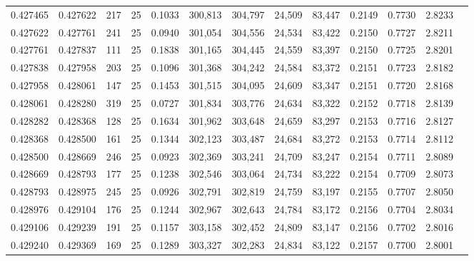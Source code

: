 \begin{tabular}{rrrrrrrrrrrrr}
0.427465 & 0.427622 &   217 &  25 &                                     0.1033 & 300,813 & 304,797 &  24,509 &  83,447 & 0.2149 & 0.7730 & 2.8233 \\
0.427622 & 0.427761 &   241 &  25 &                                     0.0940 & 301,054 & 304,556 &  24,534 &  83,422 & 0.2150 & 0.7727 & 2.8211 \\
0.427761 & 0.427837 &   111 &  25 &                                     0.1838 & 301,165 & 304,445 &  24,559 &  83,397 & 0.2150 & 0.7725 & 2.8201 \\
0.427838 & 0.427958 &   203 &  25 &                                     0.1096 & 301,368 & 304,242 &  24,584 &  83,372 & 0.2151 & 0.7723 & 2.8182 \\
0.427958 & 0.428061 &   147 &  25 &                                     0.1453 & 301,515 & 304,095 &  24,609 &  83,347 & 0.2151 & 0.7720 & 2.8168 \\
0.428061 & 0.428280 &   319 &  25 &                                     0.0727 & 301,834 & 303,776 &  24,634 &  83,322 & 0.2152 & 0.7718 & 2.8139 \\
0.428282 & 0.428368 &   128 &  25 &                                     0.1634 & 301,962 & 303,648 &  24,659 &  83,297 & 0.2153 & 0.7716 & 2.8127 \\
0.428368 & 0.428500 &   161 &  25 &                                     0.1344 & 302,123 & 303,487 &  24,684 &  83,272 & 0.2153 & 0.7714 & 2.8112 \\
0.428500 & 0.428669 &   246 &  25 &                                     0.0923 & 302,369 & 303,241 &  24,709 &  83,247 & 0.2154 & 0.7711 & 2.8089 \\
0.428669 & 0.428793 &   177 &  25 &                                     0.1238 & 302,546 & 303,064 &  24,734 &  83,222 & 0.2154 & 0.7709 & 2.8073 \\
0.428793 & 0.428975 &   245 &  25 &                                     0.0926 & 302,791 & 302,819 &  24,759 &  83,197 & 0.2155 & 0.7707 & 2.8050 \\
0.428976 & 0.429104 &   176 &  25 &                                     0.1244 & 302,967 & 302,643 &  24,784 &  83,172 & 0.2156 & 0.7704 & 2.8034 \\
0.429106 & 0.429239 &   191 &  25 &                                     0.1157 & 303,158 & 302,452 &  24,809 &  83,147 & 0.2156 & 0.7702 & 2.8016 \\
0.429240 & 0.429369 &   169 &  25 &                                     0.1289 & 303,327 & 302,283 &  24,834 &  83,122 & 0.2157 & 0.7700 & 2.8001 \\

\end{tabular}
